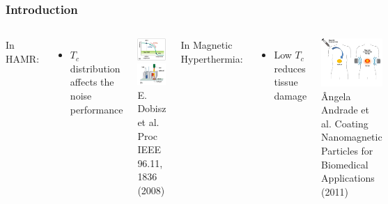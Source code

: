 \documentclass{beamer}
\begin{document}
\begin{frame}
	\frametitle{Introduction}
	\begin{columns}
		\column{6cm}
		In HAMR\footnotemark[1]:
		\begin{itemize}
			\item{$T_c$ distribution affects the noise performance}
		\end{itemize} \vspace{5mm}

		\begin{center}
		\includegraphics[width=2.8cm]{Images/coerc} \hspace{1mm}
		\includegraphics[width=2.8cm]{Images/laser} \\
		\tiny E. Dobisz et al. Proc IEEE 96.11, 1836 (2008)
		\end{center}

		\column{6cm}
		In Magnetic Hyperthermia\footnotemark[2]:
		\begin{itemize}
		\item{Low $T_c$ reduces tissue damage}
		\end{itemize}

		\begin{center}
		\includegraphics[width=4cm]{Images/person} \\
		\tiny \^{A}ngela Andrade et al. Coating Nanomagnetic Particles for Biomedical Applications (2011)
		\end{center}
	\end{columns}
\end{frame}
\end{document}
